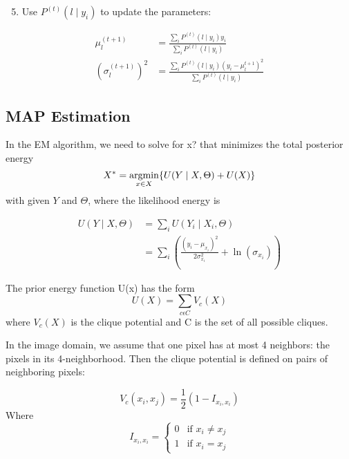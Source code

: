 \begin{enumerate}
	\setcounter{enumi}{4}
	\item Use \(P^{(t)}(l \mid y_i)\) to update the parameters: 
\end{enumerate}

\begin{equation}
\begin{split}
\mu^{(t+1)}_l & = \frac{{\sum\limits_{i}}P^{(t)}(l \mid y_i)y_i}{{\sum\limits_{i}}P^{(t)}(l \mid y_i)} \\
(\sigma^{(t+1)}_l)^2 & =\frac{{\sum\limits_{i}}P^{(t)}(l \mid y_i)(y_i-\mu^{t+1}_l)^2}{{\sum\limits_{i}}P^{(t)}(l \mid y_i)}
\end{split}
\end{equation}

\subsection{MAP Estimation}
In the EM algorithm, we need to solve for x? that minimizes
the total posterior energy
\begin{equation}\label{eq:MAp}
X^* = \operatorname*{argmin}_{x \in X} \{U( Y \mid X, \Theta) + U(X)\}
\end{equation}
with given $Y$ and $\Theta$, where the likelihood energy is

\begin{equation}
\begin{split}
U( Y \mid X, \Theta) & ={\sum\limits_{i}}U( Y_i \mid X_i, \Theta)\\
& = {\sum\limits_{i}}(\frac{(y_i-\mu_{x_i})^2}{2\sigma_{x_i}^2} + \ln(\sigma_{x_i}))
\end{split}
\end{equation}

The prior energy function U(x) has the form
\begin{equation}
U(X) = {\sum\limits_{c \epsilon C}}V_c(X)
\end{equation}
where $V_c(X)$ is the clique potential and C is the set of all
possible cliques.

In the image domain, we assume that one pixel has at most 4 neighbors: the pixels in its 4-neighborhood. Then the clique potential is defined on pairs of neighboring pixels:

\begin{equation}
V_c(x_i,x_j) = \frac{1}{2}(1-I_{x_i,x_i})
\end{equation}
Where
\begin{equation}
I_{x_i,x_i}=
\begin{cases} 
0 & \text{if } x_i\neq x_j \\
1      & \text{if } x_i= x_j 
\end{cases}
\end{equation}

